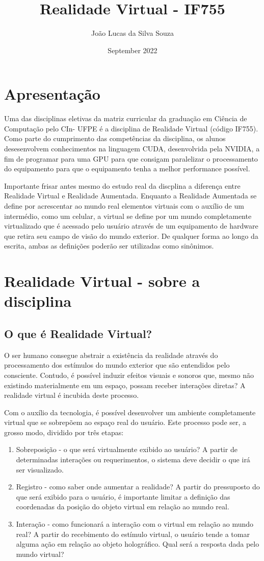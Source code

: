 \documentclass[a4paper, 10pt]{article}
\title{Realidade Virtual - IF755}
\author{João Lucas da Silva Souza}
\date{September 2022}
\begin{document}
\maketitle

\section{Apresentação}
Uma das disciplinas eletivas da matriz curricular da graduação em Ciência de Computação pelo CIn- UFPE é a disciplina de Realidade Virtual (código IF755).  Como parte do cumprimento das competências da disciplina, os alunos desesenvolvem conhecimentos na linguagem CUDA, desenvolvida pela NVIDIA, a fim de programar para uma GPU para que consigam paralelizar o processamento do equipamento para que o equipamento tenha a melhor performance possível.

Importante frisar antes mesmo do estudo real da discplina a diferença entre Realidade Virtual e Realidade Aumentada. Enquanto a Realidade Aumentada se define por acrescentar ao mundo real elementos virtuais com o auxílio de um intermédio, como um celular, a virtual se define por um mundo completamente virtualizado que é acessado pelo usuário através de um equipamento de hardware que retira seu campo de visão do mundo exterior. De qualquer forma ao longo da escrita, ambas as definições poderão ser utilizadas como sinônimos.

\section{Realidade Virtual - sobre a disciplina}
\subsection{O que é Realidade Virtual?}
O ser humano consegue abstrair a existência da realidade através do processamento dos estímulos do mundo exterior que são entendidos pelo consciente. Contudo, é possível induzir efeitos visuais e sonoros que, mesmo não existindo materialmente em um espaço, possam receber interações diretas? A realidade virtual é incubida deste processo.

Com o auxílio da tecnologia, é possível desenvolver um ambiente completamente virtual que se sobrepõem ao espaço real do usuário. Este processo pode ser, a grosso modo, dividido por três etapas:
\begin{enumerate}
    \item Sobreposição - o que será virtualmente exibido ao usuário? A partir de determinadas interações ou requerimentos, o sistema deve decidir o que irá ser visualizado.
    \item Registro - como saber onde aumentar a realidade? A partir do pressuposto do que será exibido para o usuário, é importante limitar a definição das coordenadas da posição do objeto virtual em relação ao mundo real.
    \item Interação - como funcionará a interação com o virtual em relação ao mundo real? A partir do recebimento do estímulo virtual, o usuário tende a tomar alguma ação em relação ao objeto holográfico. Qual será a resposta dada pelo mundo virtual?
\end{enumerate}
\end{document}
